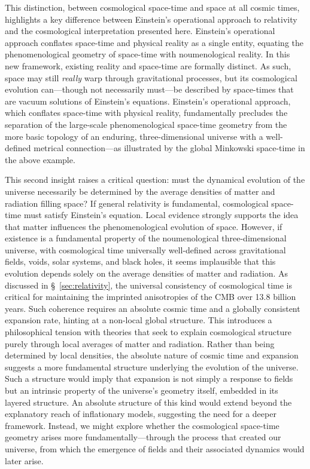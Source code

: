 \documentclass[aps,rmp,groupedaddress,twocolumn,10pt]{revtex4-2}
\begin{document}
This distinction, between cosmological space-time and space at all cosmic times, highlights a key difference between Einstein's operational approach to relativity and the cosmological interpretation presented here. Einstein's operational approach conflates space-time and physical reality as a single entity, equating the phenomenological geometry of space-time with noumenological reality. In this new framework, existing reality and space-time are formally distinct. As such, space may still \textit{really} warp through gravitational processes, but its cosmological evolution can---though not necessarily must---be described by space-times that are vacuum solutions of Einstein's equations. Einstein's operational approach, which conflates space-time with physical reality, fundamentally precludes the separation of the large-scale phenomenological space-time geometry from the more basic topology of an enduring, three-dimensional universe with a well-defined metrical connection---as illustrated by the global Minkowski space-time in the above example.

This second insight raises a critical question: must the dynamical evolution of the universe necessarily be determined by the average densities of matter and radiation filling space? If general relativity is fundamental, cosmological space-time must satisfy Einstein's equation. Local evidence strongly supports the idea that matter influences the phenomenological evolution of space. However, if existence is a fundamental property of the noumenological three-dimensional universe, with cosmological time universally well-defined across gravitational fields, voids, solar systems, and black holes, it seems implausible that this evolution depends solely on the average densities of matter and radiation. As discussed in \S~\ref{sec:relativity}, the universal consistency of cosmological time is critical for maintaining the imprinted anisotropies of the CMB over 13.8 billion years. Such coherence requires an absolute cosmic time and a globally consistent expansion rate, hinting at a non-local global structure. This introduces a philosophical tension with theories that seek to explain cosmological structure purely through local averages of matter and radiation. Rather than being determined by local densities, the absolute nature of cosmic time and expansion suggests a more fundamental structure underlying the evolution of the universe. Such a structure would imply that expansion is not simply a response to fields but an intrinsic property of the universe's geometry itself, embedded in its layered structure. 
An absolute structure of this kind would extend beyond the explanatory reach of inflationary models, suggesting the need for a deeper framework. Instead, we might explore whether the cosmological space-time geometry arises more fundamentally---through the process that created our universe, from which the emergence of fields and their associated dynamics would later arise.
\end{document}
